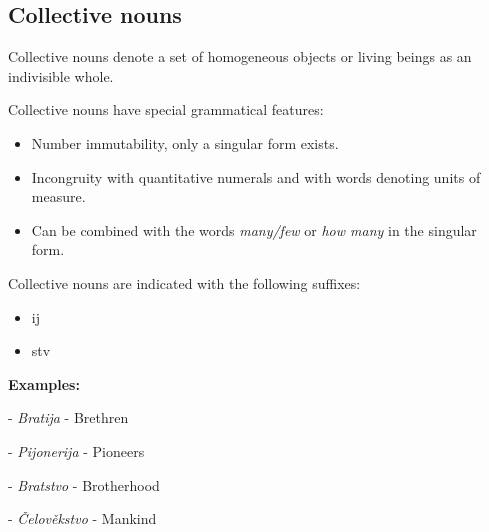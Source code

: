 \subsection{Collective nouns}

Collective nouns denote a set of homogeneous objects or living beings as an indivisible whole.

Collective nouns have special grammatical features:

\begin{itemize}
	\item Number immutability, only a singular form exists.
	\item Incongruity with quantitative numerals and with words denoting units of measure.
	\item Can be combined with the words \textit{many/few} or \textit{how many} in the singular form.
\end{itemize}

Collective nouns are indicated with the following suffixes:

\begin{itemize}
	\item ij
	\item stv
\end{itemize}

\textbf{Examples:}

- \textit{Bratija} - Brethren

- \textit{Pijonerija} - Pioneers

- \textit{Bratstvo} - Brotherhood

- \textit{Čelověkstvo} - Mankind


